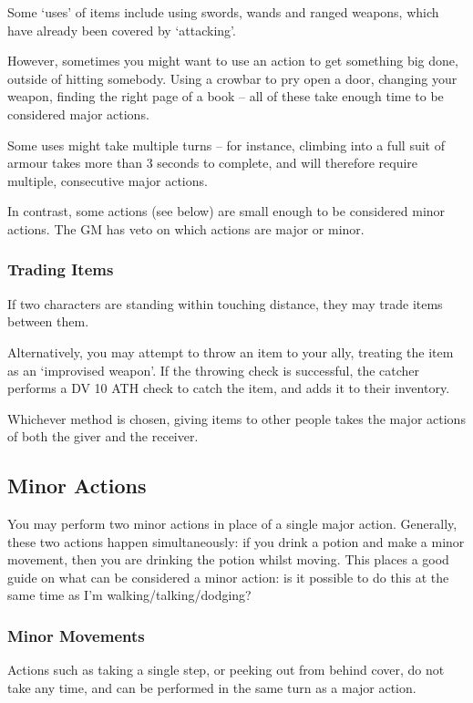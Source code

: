 Some `uses' of items include using swords, wands and ranged weapons, which have already been covered by `attacking'. 

However, sometimes you might want to use an action to get something big done, outside of hitting somebody. Using a crowbar to pry open a door, changing your weapon, finding the right page of a book -- all of these take enough time to be considered major actions. 

Some uses might take multiple turns -- for instance, climbing into a full suit of armour takes more than 3 seconds to complete, and will therefore require multiple, consecutive major actions. 

In contrast, some actions (see below) are small enough to be considered minor actions. The GM has veto on which actions are major or minor. 

\subsubsection{Trading Items}

If two characters are standing within touching distance, they may trade items between them. 

Alternatively, you may attempt to throw an item to your ally, treating the item as an `improvised weapon'. If the throwing check is successful, the catcher performs a DV 10 ATH check to catch the item, and adds it to their inventory. 

Whichever method is chosen, giving items to other people takes the major actions of both the giver and the receiver. 


\subsection{Minor Actions}
You may perform two minor actions in place of a single major action. Generally, these two actions happen simultaneously: if you drink a potion and make a minor movement, then you are drinking the potion whilst moving. This places a good guide on what can be considered a minor action: is it possible to do this at the same time as I'm walking/talking/dodging? 

\subsubsection{Minor Movements}

Actions such as taking a single step, or peeking out from behind cover, do not take any time, and can be performed in the same turn as a major action. 


